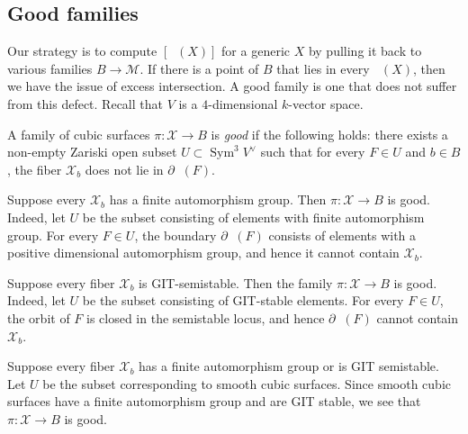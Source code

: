 \documentclass[reqno]{amsart}
\renewcommand{\k}{k}
\DeclareMathOperator{\Orb}{\overline{Orb}}
\renewcommand{\to}{{\longrightarrow}}
\providecommand{\Sym}{\operatorname{Sym}}
\numberwithin{equation}{section}
\newcommand{\cX}{\mathcal{X}}
\begin{document}
\subsection{Good families}
\label{sec:good-families}
Our strategy is to compute $[\Orb(X)]$ for a generic $X$ by pulling it back to various families $B \to \mathscr{M}$.
If there is a point of $B$ that lies in every $\Orb(X)$, then we have the issue of excess intersection.
A good family is one that does not suffer from this defect.
Recall that $V$ is a $4$-dimensional $\k$-vector space.
\begin{definition}
\label{def:goodfamily}
A family of cubic surfaces $\pi \colon \cX \to B$ is \emph{good} if
the following holds: there exists a non-empty Zariski open subset
$U \subset \Sym^3V^{\vee}$ such that for every $F \in U$ and $b \in B$,
the fiber $\cX_b$ does not lie in $\partial \Orb(F)$.
\end{definition}
\begin{example}
  \label{ex:finaut}
  Suppose every $\cX_b$ has a finite automorphism group.  Then
  $\pi \colon \cX \to B$ is good.  Indeed, let $U$ be the subset
  consisting of elements with finite automorphism group.  For every
  $F \in U$, the boundary $\partial \Orb(F)$ consists of elements with
  a positive dimensional automorphism group, and hence it cannot
  contain $\cX_b$.
\end{example}
\begin{example}
  \label{ex:semistable}
  Suppose every fiber $\cX_b$ is GIT-semistable.
  Then the family $\pi \colon \cX \to B$ is good.
  Indeed, let $U$ be the subset consisting of GIT-stable elements.
  For every $F \in U$, the orbit of $F$ is closed in the semistable locus, and hence $\partial \Orb(F)$ cannot contain $\cX_b$.
\end{example}
\begin{example}[A combination]
  Suppose every fiber $\cX_b$ has a finite automorphism group or is GIT semistable.
  Let $U$ be the subset corresponding to smooth cubic surfaces.
  Since smooth cubic surfaces have a finite automorphism group and are GIT stable, we see that $\pi \colon \mathcal{X} \to B$ is good.
\end{example}
\end{document}
